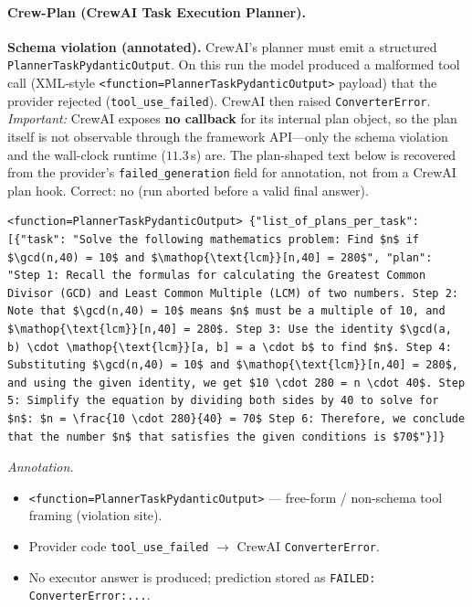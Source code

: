\paragraph{Crew-Plan (CrewAI Task Execution Planner).}
\textbf{Schema violation (annotated).}
CrewAI's planner must emit a structured \texttt{PlannerTaskPydanticOutput}.
On this run the model produced a malformed tool call
(XML-style \texttt{<function=PlannerTaskPydanticOutput>} payload) that the provider rejected
(\texttt{tool\_use\_failed}). CrewAI then raised \texttt{ConverterError}.
\emph{Important:} CrewAI exposes \textbf{no callback} for its internal plan object, so the
plan itself is not observable through the framework API---only the schema violation and the
wall-clock runtime ($11.3$\,s) are. The plan-shaped text below is recovered from the
provider's \texttt{failed\_generation} field for annotation, not from a CrewAI plan hook.
Correct: no (run aborted before a valid final answer).
\begin{verbatim}
<function=PlannerTaskPydanticOutput> {"list_of_plans_per_task": [{"task": "Solve the following mathematics problem: Find $n$ if $\gcd(n,40) = 10$ and $\mathop{\text{lcm}}[n,40] = 280$", "plan": "Step 1: Recall the formulas for calculating the Greatest Common Divisor (GCD) and Least Common Multiple (LCM) of two numbers. Step 2: Note that $\gcd(n,40) = 10$ means $n$ must be a multiple of 10, and $\mathop{\text{lcm}}[n,40] = 280$. Step 3: Use the identity $\gcd(a, b) \cdot \mathop{\text{lcm}}[a, b] = a \cdot b$ to find $n$. Step 4: Substituting $\gcd(n,40) = 10$ and $\mathop{\text{lcm}}[n,40] = 280$, and using the given identity, we get $10 \cdot 280 = n \cdot 40$. Step 5: Simplify the equation by dividing both sides by 40 to solve for $n$: $n = \frac{10 \cdot 280}{40} = 70$ Step 6: Therefore, we conclude that the number $n$ that satisfies the given conditions is $70$"}]}
\end{verbatim}

\noindent\textit{Annotation.}
\begin{itemize}\setlength{\itemsep}{2pt}
\item \texttt{<function=PlannerTaskPydanticOutput>} --- free-form / non-schema tool framing (violation site).
\item Provider code \texttt{tool\_use\_failed} $\rightarrow$ CrewAI \texttt{ConverterError}.
\item No executor answer is produced; prediction stored as \texttt{FAILED: ConverterError:...}.
\end{itemize}

